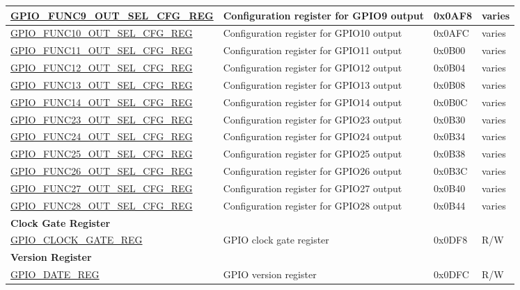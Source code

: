 \begin{longtable}{ | p{5.5cm} | p{7cm} | p{1.3cm} | p{1.9cm} | }
\hyperref[regdesc:GPIOFUNCNOUTSELCFGREG]{GPIO\_FUNC9\_OUT\_SEL\_CFG\_REG} & Configuration register for GPIO9 output & 0x0AF8 & varies \\ \hline
\hyperref[regdesc:GPIOFUNCNOUTSELCFGREG]{GPIO\_FUNC10\_OUT\_SEL\_CFG\_REG} & Configuration register for GPIO10 output & 0x0AFC & varies \\ \hline
\hyperref[regdesc:GPIOFUNCNOUTSELCFGREG]{GPIO\_FUNC11\_OUT\_SEL\_CFG\_REG} & Configuration register for GPIO11 output & 0x0B00 & varies \\ \hline
\hyperref[regdesc:GPIOFUNCNOUTSELCFGREG]{GPIO\_FUNC12\_OUT\_SEL\_CFG\_REG} & Configuration register for GPIO12 output & 0x0B04 & varies \\ \hline
\hyperref[regdesc:GPIOFUNCNOUTSELCFGREG]{GPIO\_FUNC13\_OUT\_SEL\_CFG\_REG} & Configuration register for GPIO13 output & 0x0B08 & varies \\ \hline
\hyperref[regdesc:GPIOFUNCNOUTSELCFGREG]{GPIO\_FUNC14\_OUT\_SEL\_CFG\_REG} & Configuration register for GPIO14 output & 0x0B0C & varies \\ \hline
\hyperref[regdesc:GPIOFUNCNOUTSELCFGREG]{GPIO\_FUNC23\_OUT\_SEL\_CFG\_REG} & Configuration register for GPIO23 output & 0x0B30 & varies \\ \hline
\hyperref[regdesc:GPIOFUNCNOUTSELCFGREG]{GPIO\_FUNC24\_OUT\_SEL\_CFG\_REG} & Configuration register for GPIO24 output & 0x0B34 & varies \\ \hline
\hyperref[regdesc:GPIOFUNCNOUTSELCFGREG]{GPIO\_FUNC25\_OUT\_SEL\_CFG\_REG} & Configuration register for GPIO25 output & 0x0B38 & varies \\ \hline
\hyperref[regdesc:GPIOFUNCNOUTSELCFGREG]{GPIO\_FUNC26\_OUT\_SEL\_CFG\_REG} & Configuration register for GPIO26 output & 0x0B3C & varies \\ \hline
\hyperref[regdesc:GPIOFUNCNOUTSELCFGREG]{GPIO\_FUNC27\_OUT\_SEL\_CFG\_REG} & Configuration register for GPIO27 output & 0x0B40 & varies \\ \hline
\hyperref[regdesc:GPIOFUNCNOUTSELCFGREG]{GPIO\_FUNC28\_OUT\_SEL\_CFG\_REG} & Configuration register for GPIO28 output & 0x0B44 & varies \\ \hline
\multicolumn{4}{|l|}{\textbf{Clock Gate Register}} \\ \hline
\hyperref[regdesc:GPIOCLOCKGATEREG]{GPIO\_CLOCK\_GATE\_REG} & GPIO clock gate register & 0x0DF8 & R/W \\ \hline
\multicolumn{4}{|l|}{\textbf{Version Register}} \\ \hline
\hyperref[regdesc:GPIODATEREG]{GPIO\_DATE\_REG} & GPIO version register & 0x0DFC & R/W \\ \hline
\end{longtable}
